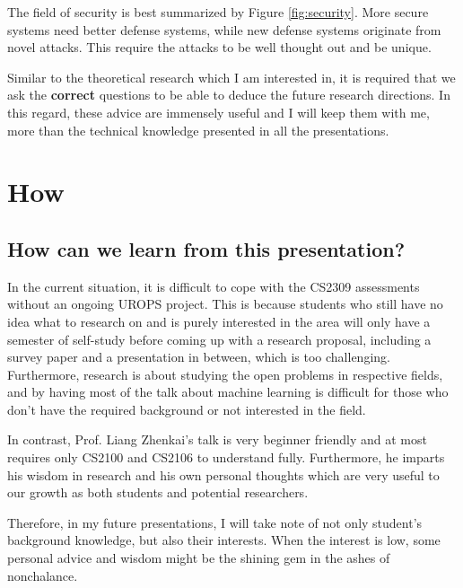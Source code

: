 \documentclass[12pt]{article}
\theoremstyle{plain}
\begin{document}
The field of security is best summarized by Figure \ref{fig:security}. More
secure systems need better defense systems, while new defense systems originate
from novel attacks. This require the attacks to be well thought out and be
unique.

Similar to the theoretical research which I am interested in, it is required
that we ask the \textbf{correct} questions to be able to deduce the future
research directions. In this regard, these advice are immensely useful and I
will keep them with me, more than the technical knowledge presented in all the
presentations.

\section{How}
\subsection{How can we learn from this presentation?}
\label{subsec:selection}
In the current situation, it is difficult to cope with the CS2309 assessments
without an ongoing UROPS project. This is because students who still have no
idea what to research on and is purely interested in the area will only have a
semester of self-study before coming up with a research proposal, including a
survey paper and a presentation in between, which is too challenging.
Furthermore, research is about studying the open problems in respective fields,
and by having most of the talk about machine learning is difficult for those who
don't have the required background or not interested in the field.

In contrast, Prof. Liang Zhenkai's talk is very beginner friendly and at most
requires only CS2100 and CS2106 to understand fully. Furthermore, he imparts his
wisdom in research and his own personal thoughts which are very useful to our
growth as both students and potential researchers.

Therefore, in my future presentations, I will take note of not only student's
background knowledge, but also their interests. When the interest is low, some
personal advice and wisdom might be the shining gem in the ashes of nonchalance.
\end{document}
